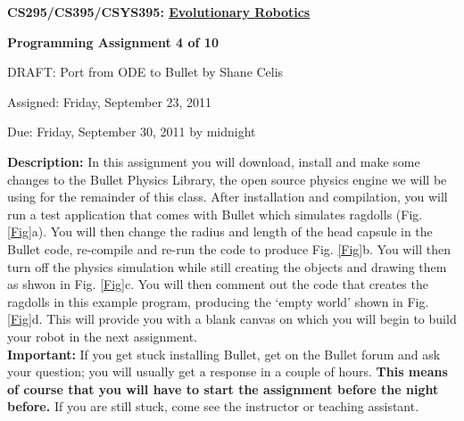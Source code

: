 \documentclass[12pt]{article}
\begin{document}
\centerline{\bf \Large CS295/CS395/CSYS395: \href{CS295_395_Syllabus.pdf}{\underline{Evolutionary Robotics}}}

\vspace{0.5cm}

\centerline{\bf \large Programming Assignment 4 of 10}

\vspace{0.25cm} \centerline{\color{red}DRAFT: Port from ODE to Bullet by Shane Celis \color{black}}

\vspace{0.5cm}

\centerline{\large Assigned: Friday, September 23, 2011}

\vspace{0.5cm}

\centerline{\large Due: Friday, September 30, 2011 by midnight}

\vspace{0.5cm}

\noindent \textbf{Description:} In this assignment you will download, install and make some changes to the Bullet Physics Library, the open source physics engine we will be using for the remainder of this class. After installation and compilation, you will run a test application that comes with Bullet which simulates ragdolls (Fig. \ref{Fig}a). You will then change the radius and length of the head capsule in the Bullet code, re-compile and re-run the code to produce Fig. \ref{Fig}b. You will then turn off the physics simulation while still creating the objects and drawing them as shwon in Fig. \ref{Fig}c. You will then comment out the code that creates the ragdolls in this example program, producing the `empty world' shown in Fig. \ref{Fig}d. This will provide you with a blank canvas on which you will begin to build your robot in the next assignment. \\

\noindent \textbf{Important:} If you get stuck installing Bullet, get on the Bullet forum and ask your question; you will usually get a response in a couple of hours. \textbf{This means of course that you will have to start the assignment before the night before.} If you are still stuck, come see the instructor or teaching assistant.
\end{document}
